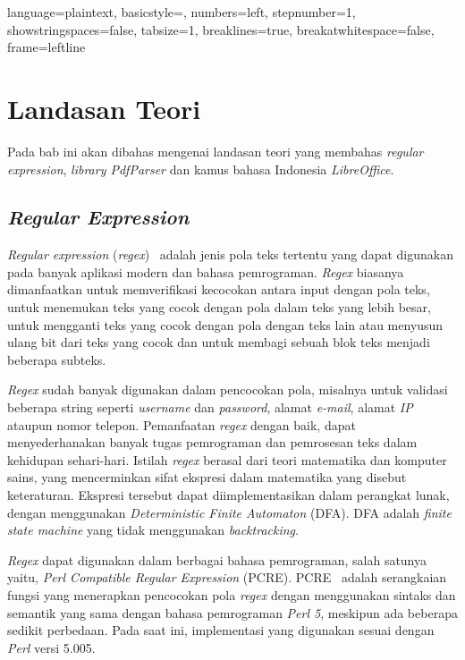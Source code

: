 
\lstset
{ 
    language=plaintext,
    basicstyle=\footnotesize,
    numbers=left,
    stepnumber=1,
    showstringspaces=false,
    tabsize=1,
    breaklines=true,
    breakatwhitespace=false,
    frame=leftline
}

\chapter{Landasan Teori}
\label{chap:teori}

Pada bab ini akan dibahas mengenai landasan teori yang membahas \textit{regular expression}, \textit{library PdfParser} dan kamus bahasa Indonesia \textit{LibreOffice}.

\section{\textit{Regular Expression}}
\label{sec:regex} 
 
\textit{Regular expression} (\textit{regex})~\cite{jan:12:cookbook} adalah jenis pola teks tertentu yang dapat digunakan pada banyak aplikasi modern dan bahasa pemrograman. \textit{Regex} biasanya dimanfaatkan untuk memverifikasi kecocokan antara input dengan pola teks, untuk menemukan teks yang cocok dengan pola dalam teks yang lebih besar, untuk mengganti teks yang cocok dengan pola dengan teks lain atau menyusun ulang bit dari teks yang cocok dan untuk membagi sebuah blok teks menjadi beberapa subteks.

\textit{Regex} sudah banyak digunakan dalam pencocokan pola, misalnya untuk validasi beberapa string seperti \textit{username} dan \textit{password}, alamat \textit{e-mail}, alamat \textit{IP} ataupun nomor telepon. Pemanfaatan \textit{regex} dengan baik, dapat menyederhanakan banyak tugas pemrograman dan pemrosesan teks dalam kehidupan sehari-hari. Istilah \textit{regex} berasal dari teori matematika dan komputer sains, yang mencerminkan sifat ekspresi dalam matematika yang disebut keteraturan. Ekspresi tersebut dapat diimplementasikan dalam perangkat lunak, dengan menggunakan \textit{Deterministic Finite Automaton} (DFA). DFA adalah \textit{finite state machine} yang tidak menggunakan \textit{backtracking}.

\textit{Regex} dapat digunakan dalam berbagai bahasa pemrograman, salah satunya yaitu, \textit{Perl Compatible Regular Expression} (PCRE). PCRE~\cite{pcre} adalah serangkaian fungsi yang menerapkan pencocokan pola \textit{regex} dengan menggunakan sintaks dan semantik yang sama dengan bahasa pemrograman \textit{Perl 5}, meskipun ada beberapa sedikit perbedaan. Pada saat ini, implementasi yang digunakan sesuai dengan \textit{Perl} versi 5.005.

